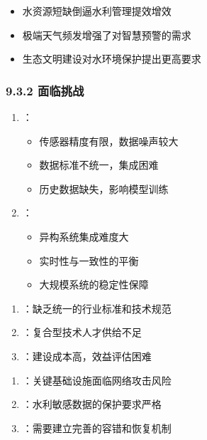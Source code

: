 
\begin{itemize}
\tightlist
\item
  水资源短缺倒逼水利管理提效增效
\item
  极端天气频发增强了对智慧预警的需求
\item
  生态文明建设对水环境保护提出更高要求
\end{itemize}

\hypertarget{ux9762ux4e34ux6311ux6218}{%
\subsubsection{9.3.2 面临挑战}\label{ux9762ux4e34ux6311ux6218}}


\begin{enumerate}
\def\labelenumi{\arabic{enumi}.}
\tightlist
\item
  ：

  \begin{itemize}
  \tightlist
  \item
    传感器精度有限，数据噪声较大
  \item
    数据标准不统一，集成困难
  \item
    历史数据缺失，影响模型训练
  \end{itemize}
\item
  ：

  \begin{itemize}
  \tightlist
  \item
    异构系统集成难度大
  \item
    实时性与一致性的平衡
  \item
    大规模系统的稳定性保障
  \end{itemize}
\end{enumerate}


\begin{enumerate}
\def\labelenumi{\arabic{enumi}.}
\tightlist
\item
  ：缺乏统一的行业标准和技术规范
\item
  ：复合型技术人才供给不足
\item
  ：建设成本高，效益评估困难
\end{enumerate}


\begin{enumerate}
\def\labelenumi{\arabic{enumi}.}
\tightlist
\item
  ：关键基础设施面临网络攻击风险
\item
  ：水利敏感数据的保护要求严格
\item
  ：需要建立完善的容错和恢复机制
\end{enumerate}

